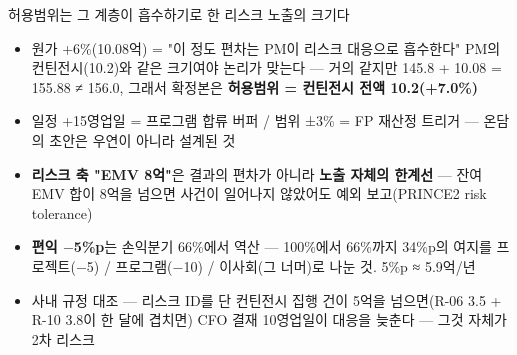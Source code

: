\begin{frame}{허용범위는 그 계층이 흡수하기로 한 리스크 노출의 크기다}
\begin{itemize}
\item 원가 +6\%(10.08억) = "이 정도 편차는 PM이 리스크 대응으로 흡수한다" \ra{} PM의 컨틴전시(10.2)와 같은 크기여야 논리가 맞는다 — 거의 같지만 145.8 + 10.08 = 155.88 ≠ 156.0, 그래서 확정본은 \textbf{허용범위 = 컨틴전시 전액 10.2(+7.0\%)}
\item 일정 +15영업일 = 프로그램 합류 버퍼 / 범위 ±3\% = FP 재산정 트리거 — 온담의 초안은 우연이 아니라 설계된 것
\item \textbf{리스크 축 "EMV 8억"}은 결과의 편차가 아니라 \textbf{노출 자체의 한계선} — 잔여 EMV 합이 8억을 넘으면 사건이 일어나지 않았어도 예외 보고(PRINCE2 risk tolerance)
\item \textbf{편익 $-$5\%p}는 손익분기 66\%에서 역산 — 100\%에서 66\%까지 34\%p의 여지를 프로젝트($-$5) / 프로그램($-$10) / 이사회(그 너머)로 나눈 것. 5\%p ≈ 5.9억/년
\item 사내 규정 대조 — 리스크 ID를 단 컨틴전시 집행 건이 5억을 넘으면(R-06 3.5 + R-10 3.8이 한 달에 겹치면) CFO 결재 10영업일이 대응을 늦춘다 — 그것 자체가 2차 리스크
\end{itemize}
\end{frame}

